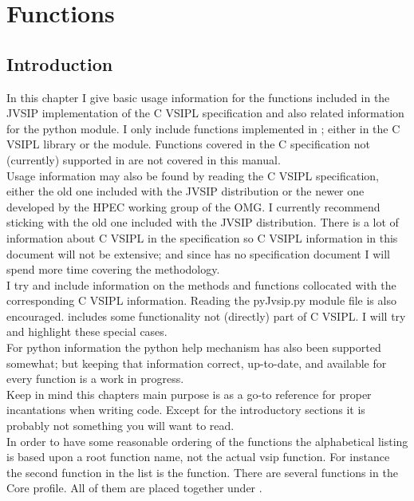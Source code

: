 \chapter{Functions}
\section*{Introduction}
\raggedright 
In this chapter I give basic usage information for the functions included in the JVSIP implementation of the C VSIPL specification and also related information for the \pyjv{} python module.  I only include functions implemented in \jv{}; either in the C VSIPL library or the \pyjv{} module. Functions covered in the C specification not (currently) supported in  are not covered in this manual.\\[6pt]
Usage information may also be found by reading the C VSIPL specification, either the old one included with the JVSIP distribution or the newer one developed by the HPEC working group of the OMG.  I currently recommend sticking with the old one included with the JVSIP distribution.  There is a lot of information about C VSIPL in the specification so C VSIPL information in this document will not be extensive; and since \pyjv{}	 has no specification document I will spend more time covering the \pyjv{} methodology.\\[6pt]
I try and include information on the \pyjv{} methods and functions collocated with the corresponding C VSIPL information.  Reading the pyJvsip.py module file is also encouraged.   includes some functionality not (directly) part of C VSIPL.  I will try and highlight these special cases.\\[6pt] 
For python information the python help mechanism has also been supported somewhat; but keeping that information correct, up-to-date, and available for every function is a work in progress.\\[6pt]
Keep in mind this chapters main purpose is as a go-to reference for proper incantations when writing code. Except for the introductory sections it is probably not something you will want to read.\\[6pt]
In order to have some reasonable ordering of the functions the alphabetical listing is based upon a root function name, not the actual vsip function. For instance the second function in the list is the  function. There are several  functions in the Core profile. All of them are placed together under .\\[6pt]
